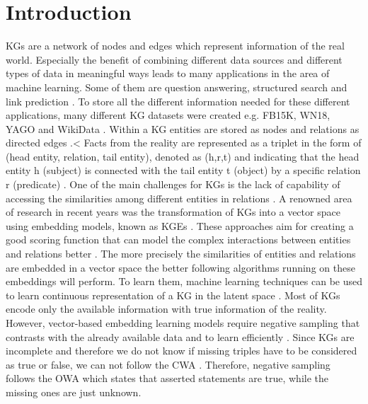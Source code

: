 \chapter{Introduction}
\label{ch:introduction}

\acp{KG} are a network of nodes and edges which represent information of the real world. 
Especially the benefit of combining different data sources and different types of data in meaningful ways leads to many applications in the area of machine learning.
Some of them are question answering, structured search \cite{zhang2019nscaching} and link prediction \cite{cai2017kbgan, Alam2020AffinityDN}.
To store all the different information needed for these different applications, many different \ac{KG} datasets were created e.g. FB15K, WN18, YAGO \cite{ConEx} and WikiData \cite{arnaoutwikinegata}.
Within a \ac{KG} entities are stored as nodes and relations as directed edges \cite{zhang2019nscaching}.<
Facts from the reality are represented as a triplet in the form of (head entity, relation, tail entity), denoted as (h,r,t) and indicating that the head entity h (subject) is connected with the tail entity t (object) by a specific relation r (predicate) \cite{zhang2019nscaching, Alam2020AffinityDN}.
One of the main challenges for \acp{KG} is the lack of capability of accessing the similarities among different entities in relations \cite{cai2017kbgan}. 
A renowned area of research in recent years was the transformation of \acp{KG} into a vector space using embedding models, known as \acp{KGE} \cite{Alam2020AffinityDN}.
These approaches aim for creating a good scoring function that can model the complex interactions between entities and relations better \cite{zhang2019nscaching}.
The more precisely the similarities of entities and relations are embedded in a vector space the better following algorithms running on these embeddings will perform.
To learn them, machine learning techniques can be used to learn continuous representation of a \ac{KG} in the latent space \cite{cai2017kbgan}. 
Most of \acp{KG} encode only the available information with true information of the reality.
However, vector-based embedding learning models require negative sampling that contrasts with the already available data and to learn efficiently \cite{Alam2020AffinityDN}.
Since \acp{KG} are incomplete and therefore we do not know if missing triples have to be considered as true or false, we can not follow the \ac{CWA} \cite{arnaout2020enriching}.
Therefore, negative sampling follows the \ac{OWA} which states that asserted statements are true, while the missing ones are just unknown.

